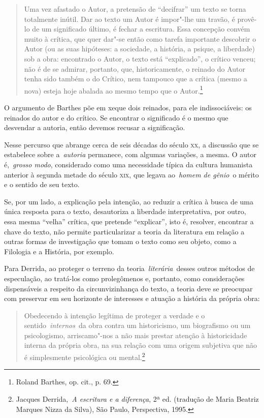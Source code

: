 \begin{quote}
Uma vez afastado o Autor, a pretensão de ``decifrar'' um texto se torna
totalmente inútil. Dar ao texto um Autor é impor"-lhe um travão, é
provê-lo de um significado último, é fechar a escritura. Essa concepção
convém muito à crítica, que quer dar"-se então como tarefa importante
descobrir o Autor (ou as suas hipóteses: a sociedade, a história, a
psique, a liberdade) sob a obra: encontrado o Autor, o texto está
``explicado'', o crítico venceu; não é de se admirar, portanto, que,
historicamente, o reinado do Autor tenha sido também o do Crítico, nem
tampouco que a crítica (mesmo a nova) esteja hoje abalada ao mesmo tempo
que o Autor.\footnote{Roland Barthes, op. cit., p. 69.}
\end{quote}

O argumento de Barthes põe em xeque dois reinados, para ele
indissociáveis: os reinados do autor e do crítico. Se encontrar o
significado é o mesmo que desvendar a autoria, então devemos recusar a
significação.

Nesse percurso que abrange cerca de seis décadas do século \textsc{xx},
a discussão que se estabelece sobre a~\emph{autoria} permanece, com
algumas variações, a mesma. O autor é,~\emph{grosso modo}, considerado
como uma necessidade típica da cultura humanista anterior à segunda
metade do século \textsc{xix}, que legava ao~\emph{homem de gênio}~o
mérito e o sentido de seu texto.

Se, por um lado, a explicação pela intenção, ao reduzir a crítica à
busca de uma única resposta para o texto, desautoriza a liberdade
interpretativa, por outro, essa mesma ``velha'' crítica, que pretende
``explicar'', isto é, resolver, encontrar a chave do texto, não permite
particularizar a teoria da literatura em relação a outras formas de
investigação que tomam o texto como seu objeto, como a Filologia e a
História, por exemplo.

Para Derrida, ao proteger o terreno da teoria~\emph{literária}~desses
outros métodos de especulação, ao tratá-los como prolegômenos e,
portanto, como considerações dispensáveis a respeito da circunvizinhança
do texto, a teoria deve se preocupar com preservar em seu horizonte de
interesses e atuação a história da própria obra:

\begin{quote}
Obedecendo à intenção legítima de proteger a verdade e o
sentido~\emph{internos}~da obra contra um historicismo, um biografismo
ou um psicologismo, arriscamo"-nos a não mais prestar atenção à
historicidade interna da própria obra, na sua relação com uma origem
subjetiva que não é simplesmente psicológica ou mental.\footnote{Jacques
  Derrida,~\emph{A escritura e a diferença}, 2ª ed. (tradução de Maria
  Beatriz Marques Nizza da Silva), São Paulo, Perspectiva, 1995.}
\end{quote}

